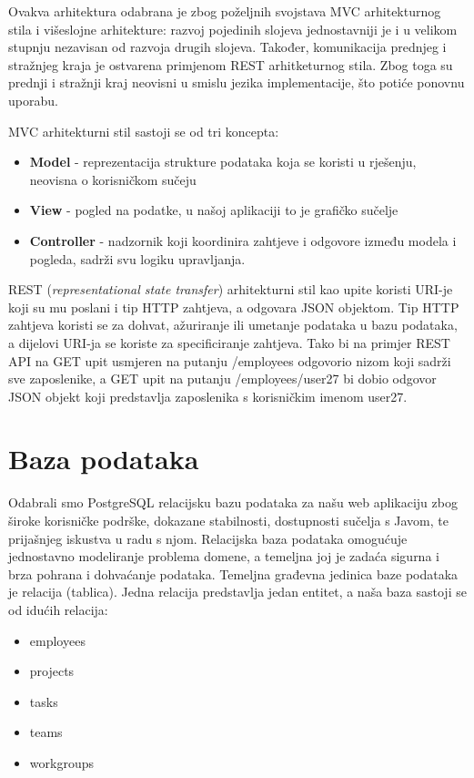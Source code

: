	Ovakva arhitektura odabrana je zbog poželjnih svojstava MVC arhitekturnog stila i višeslojne arhitekture: razvoj pojedinih slojeva jednostavniji je i u velikom stupnju nezavisan od razvoja drugih slojeva. Također, komunikacija prednjeg i stražnjeg kraja je ostvarena primjenom REST arhitketurnog stila. Zbog toga su prednji i stražnji kraj neovisni u smislu jezika implementacije, što potiće ponovnu uporabu.
	
	MVC arhitekturni stil sastoji se od tri koncepta:
	\begin{itemize}
		\item \textbf{Model} - reprezentacija strukture podataka koja se koristi u rješenju, neovisna o korisničkom sučeju
		\item \textbf{View} - pogled na podatke, u našoj aplikaciji to je grafičko sučelje
		\item \textbf{Controller} - nadzornik koji koordinira zahtjeve i odgovore između modela i pogleda, sadrži svu logiku upravljanja.
	\end{itemize}

	REST (\textit{representational state transfer}) arhitekturni stil kao upite koristi URI-je koji su mu poslani i tip HTTP zahtjeva, a odgovara JSON objektom. Tip HTTP zahtjeva koristi se za dohvat, ažuriranje ili umetanje podataka u bazu podataka, a dijelovi URI-ja se koriste za specificiranje zahtjeva. Tako bi na primjer REST API na GET upit usmjeren na putanju /employees odgovorio nizom koji sadrži sve zaposlenike, a GET upit na putanju /employees/user27 bi dobio odgovor JSON objekt koji predstavlja zaposlenika s korisničkim imenom user27.
	
		

				
		\section{Baza podataka}
			
		Odabrali smo PostgreSQL relacijsku bazu podataka za našu web aplikaciju zbog široke korisničke podrške, dokazane stabilnosti, dostupnosti sučelja s Javom, te prijašnjeg iskustva u radu s njom. Relacijska baza podataka omogućuje jednostavno modeliranje problema domene, a temeljna joj je zadaća sigurna i brza pohrana i dohvaćanje podataka. Temeljna građevna jedinica baze podataka je relacija (tablica). Jedna relacija predstavlja jedan entitet, a naša baza sastoji se od idućih relacija:
			
		\begin{itemize}
			\item employees
			\item projects
			\item tasks
			\item teams
			\item workgroups
		\end{itemize}
		
